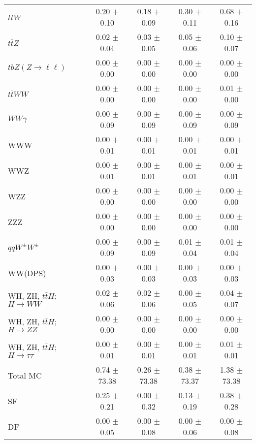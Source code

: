 \begin{tabular}{l|cccc}
                   $t\overline{t}W$ &  0.20 $\pm$  0.10 &  0.18 $\pm$  0.09 &  0.30 $\pm$  0.11 &  0.68 $\pm$  0.16 \\
                   $t\overline{t}Z$ &  0.02 $\pm$  0.04 &  0.03 $\pm$  0.05 &  0.05 $\pm$  0.06 &  0.10 $\pm$  0.07 \\
    $tbZ (Z \rightarrow \ell \ell)$ &  0.00 $\pm$  0.00 &  0.00 $\pm$  0.00 &  0.00 $\pm$  0.00 &  0.00 $\pm$  0.00 \\
                  $t\overline{t}WW$ &  0.00 $\pm$  0.00 &  0.00 $\pm$  0.00 &  0.00 $\pm$  0.00 &  0.01 $\pm$  0.00 \\
                         $WW\gamma$ &  0.00 $\pm$  0.09 &  0.00 $\pm$  0.09 &  0.00 $\pm$  0.09 &  0.00 $\pm$  0.09 \\
                                WWW &  0.00 $\pm$  0.01 &  0.00 $\pm$  0.01 &  0.00 $\pm$  0.01 &  0.00 $\pm$  0.01 \\
                                WWZ &  0.00 $\pm$  0.01 &  0.00 $\pm$  0.01 &  0.00 $\pm$  0.01 &  0.00 $\pm$  0.01 \\
                                WZZ &  0.00 $\pm$  0.00 &  0.00 $\pm$  0.00 &  0.00 $\pm$  0.00 &  0.00 $\pm$  0.00 \\
                                ZZZ &  0.00 $\pm$  0.00 &  0.00 $\pm$  0.00 &  0.00 $\pm$  0.00 &  0.00 $\pm$  0.00 \\
                 $qqW^{\pm}W^{\pm}$ &  0.00 $\pm$  0.09 &  0.00 $\pm$  0.09 &  0.01 $\pm$  0.04 &  0.01 $\pm$  0.04 \\
                            WW(DPS) &  0.00 $\pm$  0.03 &  0.00 $\pm$  0.03 &  0.00 $\pm$  0.03 &  0.00 $\pm$  0.03 \\
WH, ZH, $t\bar{t}H$; $H \rightarrow WW$ &  0.02 $\pm$  0.06 &  0.02 $\pm$  0.06 &  0.00 $\pm$  0.05 &  0.04 $\pm$  0.07 \\
WH, ZH, $t\bar{t}H$; $H \rightarrow ZZ$ &  0.00 $\pm$  0.00 &  0.00 $\pm$  0.00 &  0.00 $\pm$  0.00 &  0.00 $\pm$  0.00 \\
WH, ZH, $t\bar{t}H$; $H \rightarrow \tau\tau$ &  0.00 $\pm$  0.01 &  0.00 $\pm$  0.01 &  0.00 $\pm$  0.01 &  0.01 $\pm$  0.01 \\
\hline\hline
                           Total MC &  0.74 $\pm$ 73.38 &  0.26 $\pm$ 73.38 &  0.38 $\pm$ 73.37 &  1.38 $\pm$ 73.38 \\
\hline
                                 SF &  0.25 $\pm$  0.21 &  0.00 $\pm$  0.32 &  0.13 $\pm$  0.19 &  0.38 $\pm$  0.28 \\
                                 DF &  0.00 $\pm$  0.05 &  0.00 $\pm$  0.08 &  0.00 $\pm$  0.06 &  0.00 $\pm$  0.08 \\

\end{tabular}
